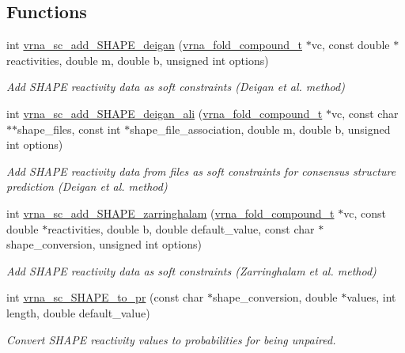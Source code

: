 \subsection*{Functions}
\begin{DoxyCompactItemize}
\item 
int \mbox{\hyperlink{group___s_h_a_p_e__reactivities_ga57d612b58e1c61dd6cfcb5a843f8f1b3}{vrna\+\_\+sc\+\_\+add\+\_\+\+S\+H\+A\+P\+E\+\_\+deigan}} (\mbox{\hyperlink{group__fold__compound_ga1b0cef17fd40466cef5968eaeeff6166}{vrna\+\_\+fold\+\_\+compound\+\_\+t}} $\ast$vc, const double $\ast$reactivities, double m, double b, unsigned int options)
\begin{DoxyCompactList}\small\item\em Add S\+H\+A\+PE reactivity data as soft constraints (Deigan et al. method) \end{DoxyCompactList}\item 
int \mbox{\hyperlink{group___s_h_a_p_e__reactivities_ga04ba85da63d8c793bb8001d1e6f800ba}{vrna\+\_\+sc\+\_\+add\+\_\+\+S\+H\+A\+P\+E\+\_\+deigan\+\_\+ali}} (\mbox{\hyperlink{group__fold__compound_ga1b0cef17fd40466cef5968eaeeff6166}{vrna\+\_\+fold\+\_\+compound\+\_\+t}} $\ast$vc, const char $\ast$$\ast$shape\+\_\+files, const int $\ast$shape\+\_\+file\+\_\+association, double m, double b, unsigned int options)
\begin{DoxyCompactList}\small\item\em Add S\+H\+A\+PE reactivity data from files as soft constraints for consensus structure prediction (Deigan et al. method) \end{DoxyCompactList}\item 
int \mbox{\hyperlink{group___s_h_a_p_e__reactivities_gaf3c65a045060aef5c4e41693d30af58c}{vrna\+\_\+sc\+\_\+add\+\_\+\+S\+H\+A\+P\+E\+\_\+zarringhalam}} (\mbox{\hyperlink{group__fold__compound_ga1b0cef17fd40466cef5968eaeeff6166}{vrna\+\_\+fold\+\_\+compound\+\_\+t}} $\ast$vc, const double $\ast$reactivities, double b, double default\+\_\+value, const char $\ast$shape\+\_\+conversion, unsigned int options)
\begin{DoxyCompactList}\small\item\em Add S\+H\+A\+PE reactivity data as soft constraints (Zarringhalam et al. method) \end{DoxyCompactList}\item 
int \mbox{\hyperlink{group___s_h_a_p_e__reactivities_ga67675b3ed48744489a3bcfa4174197cb}{vrna\+\_\+sc\+\_\+\+S\+H\+A\+P\+E\+\_\+to\+\_\+pr}} (const char $\ast$shape\+\_\+conversion, double $\ast$values, int length, double default\+\_\+value)
\begin{DoxyCompactList}\small\item\em Convert S\+H\+A\+PE reactivity values to probabilities for being unpaired. \end{DoxyCompactList}\end{DoxyCompactItemize}


